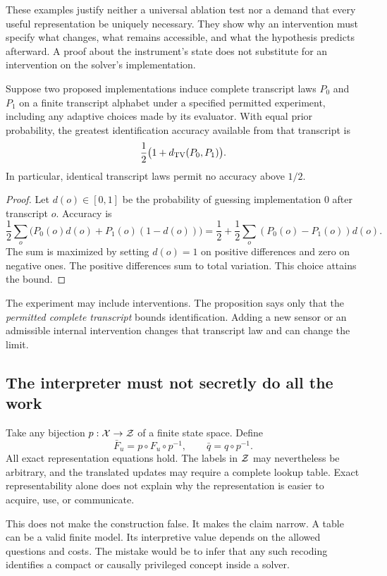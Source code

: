 These examples justify neither a universal ablation test nor a demand that every useful representation be uniquely necessary. They show why an intervention must specify what changes, what remains accessible, and what the hypothesis predicts afterward. A proof about the instrument's state does not substitute for an intervention on the solver's implementation.

\begin{MUproposition}\label{MU:prop:identification}
Suppose two proposed implementations induce complete transcript laws $P_0$ and $P_1$ on a finite transcript alphabet under a specified permitted experiment, including any adaptive choices made by its evaluator. With equal prior probability, the greatest identification accuracy available from that transcript is
\[
\frac12\bigl(1+d_{\mathrm{TV}}(P_0,P_1)\bigr).
\]
In particular, identical transcript laws permit no accuracy above $1/2$.
\end{MUproposition}
\begin{proof}
Let $d(o)\in[0,1]$ be the probability of guessing implementation 0 after transcript $o$. Accuracy is
\[
\frac12\sum_o\bigl(P_0(o)d(o)+P_1(o)(1-d(o))\bigr)
=\frac12+\frac12\sum_o(P_0(o)-P_1(o))d(o).
\]
The sum is maximized by setting $d(o)=1$ on positive differences and zero on negative ones. The positive differences sum to total variation. This choice attains the bound.
\end{proof}
The experiment may include interventions. The proposition says only that the \emph{permitted complete transcript} bounds identification. Adding a new sensor or an admissible internal intervention changes that transcript law and can change the limit.

\subsection{The interpreter must not secretly do all the work}
Take any bijection $p:\mathcal X\to\mathcal Z$ of a finite state space. Define
\[
\bar F_u=p\circ F_u\circ p^{-1},\qquad \bar q=q\circ p^{-1}.
\]
All exact representation equations hold. The labels in $\mathcal Z$ may nevertheless be arbitrary, and the translated updates may require a complete lookup table. Exact representability alone does not explain why the representation is easier to acquire, use, or communicate.

This does not make the construction false. It makes the claim narrow. A table can be a valid finite model. Its interpretive value depends on the allowed questions and costs. The mistake would be to infer that any such recoding identifies a compact or causally privileged concept inside a solver.


